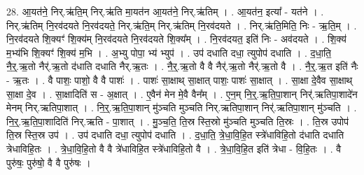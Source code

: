 \documentclass[17pt]{extarticle}
\begin{document}
28. आ॒यत॑ने॒ निर्.ऋ॑ति॒म् निर्.ऋ॑ति मा॒यत॑न आ॒यत॑ने॒ निर्.ऋ॑तिम् । . आ॒यत॑न॒ इत्या᳚ - यत॑ने । . निर्.ऋ॑तिम् नि॒रव॑दयते नि॒रव॑दयते॒ निर्.ऋ॑ति॒म् निर्.ऋ॑तिम् नि॒रव॑दयते । . निर्.ऋ॑ति॒मिति॒ निः - ऋ॒ति॒म् । . नि॒रव॑दयते शि॒क्यꣳ॑ शि॒क्य॑म् नि॒रव॑दयते नि॒रव॑दयते शि॒क्य᳚म् । . नि॒रव॑दयत॒ इति॑ निः - अव॑दयते । . शि॒क्य॑ म॒भ्य॑भि शि॒क्यꣳ॑ शि॒क्य॑ म॒भि । . अ॒भ्यु पोपा॒ भ्य॑ भ्युप॑ । . उप॑ दधाति दधा॒ त्युपोप॑ दधाति । . द॒धा॒ति॒ नै॒र्॒.ऋ॒तो नैर्॑.ऋ॒तो द॑धाति दधाति नैर्.ऋ॒तः । . नै॒र्॒.ऋ॒तो वै वै नैर्॑.ऋ॒तो नैर्॑.ऋ॒तो वै । . नै॒र्॒.ऋ॒त इति॑ नैः - ऋ॒तः । . वै पाशः॒ पाशो॒ वै वै पाशः॑ । . पाशः॑ सा॒क्षाथ् सा॒क्षात् पाशः॒ पाशः॑ सा॒क्षात् । . सा॒क्षा दे॒वैव सा॒क्षाथ् सा॒क्षा दे॒व । . सा॒क्षादिति॑ स - अ॒क्षात् । . ए॒वैन॑ मेन मे॒वै वैन᳚म् । . ए॒न॒म् नि॒र्॒.ऋ॒ति॒पा॒शान् निर्॑.ऋतिपा॒शादे॑न मेनम् निर्.ऋतिपा॒शात् । . नि॒र्॒.ऋ॒ति॒पा॒शान् मु॑ञ्चति मुञ्चति निर्.ऋतिपा॒शान् निर्॑.ऋतिपा॒शान् मु॑ञ्चति । . नि॒र्॒.ऋ॒ति॒पा॒शादिति॑ निर्.ऋति - पा॒शात् । . मु॒ञ्च॒ति॒ ति॒स्र स्ति॒स्रो मु॑ञ्चति मुञ्चति ति॒स्रः । . ति॒स्र उपोप॑ ति॒स्र स्ति॒स्र उप॑ । . उप॑ दधाति दधा॒ त्युपोप॑ दधाति । . द॒धा॒ति॒ त्रे॒धा॒वि॒हि॒त स्त्रे॑धाविहि॒तो द॑धाति दधाति त्रेधाविहि॒तः । . त्रे॒धा॒वि॒हि॒तो वै वै त्रे॑धाविहि॒त स्त्रे॑धाविहि॒तो वै । . त्रे॒धा॒वि॒हि॒त इति॑ त्रेधा - वि॒हि॒तः । . वै पुरु॑षः॒ पुरु॑षो॒ वै वै पुरु॑षः । \newline
\end{document}
